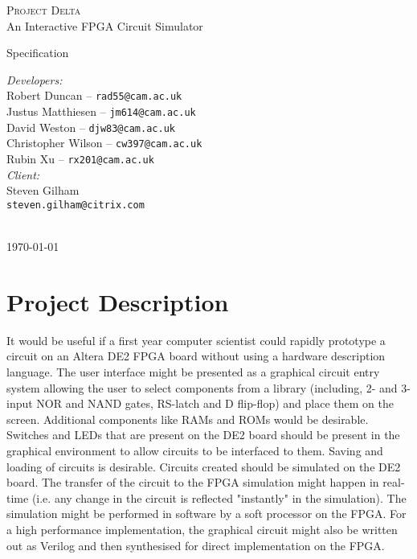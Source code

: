 \documentclass[12pt, a4paper, oneside,titlepage]{article}
\begin{document}
 \begin{titlepage}
 \begin{center}
 \textsc{\huge{Project Delta}} \\
 {\Large{An Interactive FPGA Circuit Simulator}}
\end{center}
\vspace{10em}
 \begin{center}
{\huge{Specification}}
\end{center}
\vfill
\setlength{\columnsep}{10em}
\begin{multicols}{2}{
\emph{Developers:}\\
Robert Duncan -- \texttt{rad55@cam.ac.uk} \\
Justus Matthiesen -- \texttt{jm614@cam.ac.uk}\\
David Weston -- \texttt{djw83@cam.ac.uk}\\
Christopher Wilson -- \texttt{cw397@cam.ac.uk}\\
Rubin Xu -- \texttt{rx201@cam.ac.uk}\\
\emph{Client:}\\
Steven Gilham\\
\texttt{steven.gilham@citrix.com}
\\
\\
}
\end{multicols}
\begin{center}
\today
\end{center}
 \end{titlepage}
\tableofcontents
\pagebreak
\section{Project Description}
It would be useful if a first year computer scientist could rapidly prototype a circuit on an Altera DE2 FPGA board without using a hardware description language. The user interface might be presented as a graphical circuit entry system allowing the user to select components from a library (including, 2- and 3-input NOR and NAND gates, RS-latch and D flip-flop) and place them on the screen. Additional components like RAMs and ROMs would be desirable. Switches and LEDs that are present on the DE2 board should be present in the graphical environment to allow circuits to be interfaced to them. Saving and loading of circuits is desirable. Circuits created should be simulated on the DE2 board. The transfer of the circuit to the FPGA simulation might happen in real-time (i.e. any change in the circuit is reflected "instantly" in the simulation). The simulation might be performed in software by a soft processor on the FPGA. For a high performance implementation, the graphical circuit might also be written out as Verilog and then synthesised for direct implementation on the FPGA.
\end{document}

